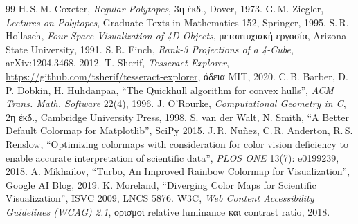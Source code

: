 \documentclass[10pt,a4paper]{article}
\theoremstyle{plain}
\theoremstyle{definition}
\newcommand{\eng}[1]{\textenglish{#1}}
\begin{document}
\begin{thebibliography}{99}\small
{} H.\,S.\,M. Coxeter, \emph{\eng{Regular Polytopes}}, 3η έκδ., \eng{Dover}, 1973.
 G.\,M. Ziegler, \emph{\eng{Lectures on Polytopes}}, \eng{Graduate Texts in Mathematics} 152, \eng{Springer}, 1995.
 S.\,R. Hollasch, \emph{\eng{Four-Space Visualization of 4D Objects}}, μεταπτυχιακή εργασία, \eng{Arizona State University}, 1991.
 S.\,R. Finch, \emph{\eng{Rank-3 Projections of a 4-Cube}}, \eng{arXiv:1204.3468}, 2012.
 T. Sherif, \emph{\eng{Tesseract Explorer}}, \url{https://github.com/tsherif/tesseract-explorer}, άδεια \eng{MIT}, 2020.
 C.\,B. Barber, D.\,P. Dobkin, H. Huhdanpaa, \eng{“The Quickhull algorithm for convex hulls”}, \emph{\eng{ACM Trans. Math. Software}} 22(4), 1996.
 J. O'Rourke, \emph{\eng{Computational Geometry in C}}, 2η έκδ., \eng{Cambridge University Press}, 1998.
 S. van der Walt, N. Smith, \eng{“A Better Default Colormap for Matplotlib”}, \eng{SciPy} 2015.
 J.\,R. Nuñez, C.\,R. Anderton, R.\,S. Renslow, \eng{“Optimizing colormaps with consideration for color vision deficiency to enable accurate interpretation of scientific data”}, \emph{\eng{PLOS ONE}} 13(7): e0199239, 2018.
 A. Mikhailov, \eng{“Turbo, An Improved Rainbow Colormap for Visualization”}, \eng{Google AI Blog}, 2019.
 K. Moreland, \eng{“Diverging Color Maps for Scientific Visualization”}, \eng{ISVC 2009, LNCS} 5876.
 \eng{W3C}, \emph{\eng{Web Content Accessibility Guidelines (WCAG) 2.1}}, ορισμοί \eng{relative luminance} και \eng{contrast ratio}, 2018.
\end{thebibliography}
\end{document}
